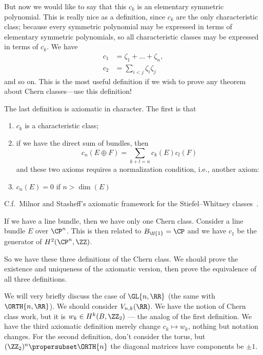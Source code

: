 But now we would like to say that this $c_{k}$ is an elementary
symmetric polynomial. This is really nice as a definition, since
$c_{k}$ are the only characteristic class; because every
symmetric polynomial may be expressed in terms of elementary
symmetric polynomials, so all characteristic classes may be
expressed in terms of $c_{k}$. We have
\begin{subequations}
\begin{align}
c_{1} &= \zeta_{1}+\dots+\zeta_{n},\\
c_{2} &= \sum_{i<j}\zeta_{i}\zeta_{j}
\end{align}
\end{subequations}
and so on. This is the most useful definition if we wish to prove
any theorem about Chern classes---use this definition!

The last definition is axiomatic in character. The first is that
\begin{enumerate}
\item $c_{k}$ is a characteristic class;
\item if we have the direct sum of bundles, then
\begin{equation}
c_{n}(E\oplus F)=\sum_{k+l=n}c_{k}(E)c_{l}(F)
\end{equation}
and these two axioms requires a normalization condition, i.e.,
another axiom:
\item $c_{n}(E)=0$ if $n>\dim(E)$
\end{enumerate}
C.f.\ Milnor and Stasheff's axiomatic framework for the
Stiefel--Whitney classes~\cite[Ch.\ 4]{milnor}.

If we have a line bundle, then we have only one Chern
class. Consider a line bundle $E$ over $\CP^{n}$. This is then
related to $B_{\U{1}}=\CP$ and we have $c_{1}$ be the generator
of $H^{2}(\CP^n,\ZZ)$.

So we have these three definitions of the Chern class. We should
prove the existence and uniqueness of the axiomatic version, then
prove the equivalence of all three definitions.

We will very briefly discuss the case of $\GL{n,\RR}$ (the same
with $\ORTH{n,\RR}$). We should consider $V_{n,k}(\RR)$. We have
the notion of Chern class work, but it is $w_{k}\in
H^{k}(B,\ZZ_{2})$ --- the analog of the first definition. We have
the third axiomatic definition merely change $c_{k}\mapsto
w_{k}$, nothing but notation changes. For the second definition,
don't consider the torus, but
$(\ZZ_{2})^{n}\propersubset\ORTH{n}$ the diagonal matrices have
components be $\pm1$.

